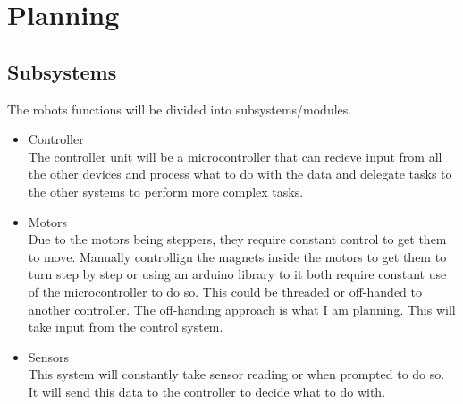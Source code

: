 \documentclass[11pt,fleqn,twoside]{article}
\begin{document}
\section{Planning}
\subsection{Subsystems}
The robots functions will be divided into subsystems/modules.
\begin{itemize}
\item Controller
\\The controller unit will be a microcontroller that can recieve input from all the other devices and process what to do with the data and delegate tasks to the other systems to perform more complex tasks.
\item Motors
\\Due to the motors being steppers, they require constant control to get them to move.  Manually controllign the magnets inside the motors to get them to turn step by step or using an arduino library to it both require constant use of the microcontroller to do so.  This could be threaded or off-handed to another controller.  The off-handing approach is what I am planning.  This will take input from the control system.
\item Sensors
\\This system will constantly take sensor reading or when prompted to do so.  It will send this data to the controller to decide what to do with.
\end{itemize}

\nocite{*} %

\newpage
{}

%
%

\renewcommand{\refname}{Annotated Bibliography}  %
\end{document}
